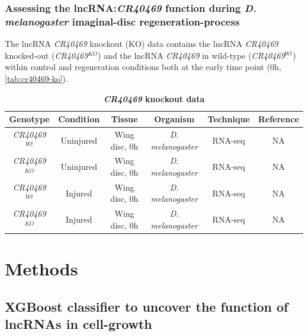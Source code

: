 \subsubsection{Assessing the lncRNA:\textit{CR40469} function during \textit{D. melanogaster} imaginal-disc regeneration-process}
\label{sec:materials-dme-three}

The lncRNA \textit{CR40469} knockout (KO) data contains the lncRNA \textit{CR40469} knocked-out (\textit{CR40469}$^{KO}$) and the lncRNA \textit{CR40469} in wild-type (\textit{CR40469}$^{Wt}$) within control and regeneration conditions both at the early time point (0h, \autoref{tab:cr40469-ko}). 

\begin{table}[!htb]
  \caption[\textit{CR40469} knockout data]{\textbf{\textit{CR40469} knockout data}}
  \begin{scriptsize}
    \begin{tabulary}{0.95\linewidth}{ccCcCc}
      \textbf{Genotype} & \textbf{Condition} & \textbf{Tissue} & \textbf{Organism} & \textbf{Technique} & \textbf{Reference} \\ \hline
      \textit{CR40469}$^{Wt}$ & Uninjured & Wing disc, 0h & \textit{D. melanogaster} & RNA-seq & NA \\
      \textit{CR40469}$^{KO}$  &  Uninjured & Wing disc, 0h & \textit{D. melanogaster} & RNA-seq & NA \\
      \textit{CR40469}$^{Wt}$  &  Injured & Wing disc, 0h & \textit{D. melanogaster} & RNA-seq & NA \\
      \textit{CR40469}$^{KO}$  &  Injured & Wing disc, 0h & \textit{D. melanogaster} & RNA-seq & NA \\
    \end{tabulary}
  \end{scriptsize}
  \label{tab:cr40469-ko}
\end{table}

\clearpage

\section[Methods]{Methods}

\subsection[XGBoost classifier to uncover the function of lncRNAs in cell-growth]{XGBoost classifier to uncover the function of lncRNAs in cell-growth}
\label{sec:ml_methods}

